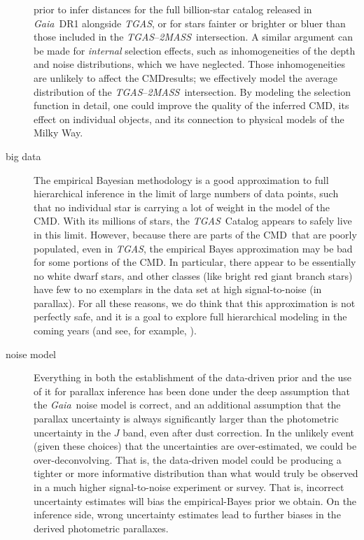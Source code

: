 \documentclass[modern]{aastex61}
\newcommand{\acronym}[1]{{\small{#1}}}
\newcommand{\project}[1]{\textsl{#1}}
\newcommand{\tgas}{\project{\acronym{TGAS}}}
\newcommand{\tmass}{\project{\acronym{2MASS}}}
\newcommand{\gaia}{\project{Gaia}}
\newcommand{\cmd}{\acronym{CMD}}
\begin{document}
\begin{description}
  prior to infer distances for the full billion-star catalog released
  in \gaia\ DR1 alongside \tgas, or for stars fainter or brighter or
  bluer than those included in the \tgas--\tmass\ intersection.
  A similar argument can be made for \textit{internal} selection effects, such as inhomogeneities of the depth and noise distributions, which we have neglected.
  Those inhomogeneities are unlikely to affect the \cmd results; we effectively model the average distribution of the \tgas--\tmass\ intersection.
  By modeling the selection function in detail, one could improve the quality of the inferred \cmd, its effect on individual objects, and its connection to physical models of the Milky Way.
\item[big data] The empirical Bayesian methodology is a good
  approximation to full hierarchical inference in the limit of large
  numbers of data points, such that no individual star is carrying a
  lot of weight in the model of the \cmd.  With its millions of stars,
  the \tgas\ Catalog appears to safely live in this limit.  However,
  because there are parts of the \cmd\ that are poorly populated, even
  in \tgas, the empirical Bayes approximation may be bad for some
  portions of the \cmd.  In particular, there appear to be essentially
  no white dwarf stars, and other classes (like bright red giant
  branch stars) have few to no exemplars in the data set at high
  signal-to-noise (in parallax).  For all these reasons, we do think
  that this approximation is not perfectly safe, and it is a goal to
  explore full hierarchical modeling in the coming years (and see, for
  example, \citealt{leistedtHogg2017}).
\item[noise model] Everything in both the establishment of the data-driven
  prior and the use of it for parallax inference has been done under the deep
  assumption that the \gaia\ noise model is correct, and an additional
  assumption that the parallax uncertainty is always significantly larger
  than the photometric uncertainty in the $J$ band, even after dust correction.
  In the unlikely event (given these choices) that the
  uncertainties are over-estimated, we could be over-deconvolving.
  That is, the data-driven model could be producing a tighter or more
  informative distribution than what would truly be observed in a much
  higher signal-to-noise experiment or survey. That is, incorrect uncertainty
  estimates will bias the empirical-Bayes prior we obtain. On the inference
  side, wrong uncertainty estimates lead to further biases in the derived photometric parallaxes.

\end{description}
\end{document}
